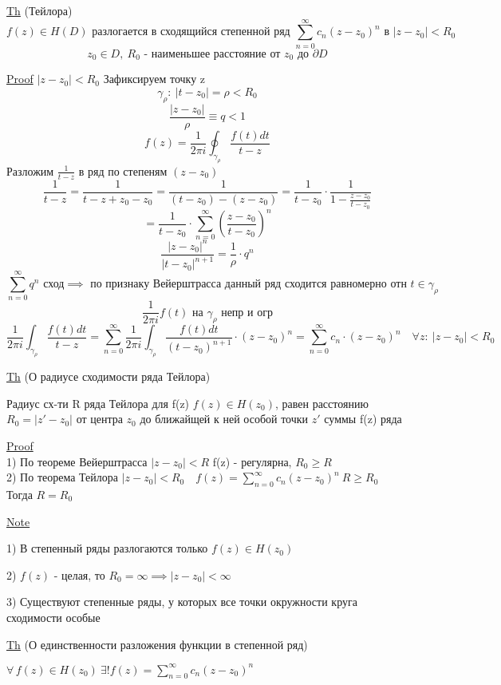 \documentclass[a4paper]{article}
\begin{document}
\begin{tcolorbox}
    \underline{Th} (Тейлора)
    \[
        f(z) \in H(D) \text{ разлогается в сходящийся степенной ряд }
        \sum_{n=0}^{\infty} c_n ( z - z_0)^{n} \text{ в } |z - z_0| < R_0
    \]
    \[
        z_0 \in D, \ R_0 \text{ - наименьшее расстояние от } z_0 \text{ до } \partial D
    \]

    \underline{Proof} $ |z - z_0| < R_0 $ 
    Зафиксируем точку z
    \[
        \gamma_\rho: \ |t - z_0| = \rho < R_0
    \]
    \[
        \frac{|z - z_0|}{\rho} \equiv q  < 1
    \]
    \[
        f(z) = \frac{1}{2 \pi i} \oint_{\gamma_\rho} \frac{f(t) dt}{t - z} 
    \]
    Разложим $ \frac{1}{t- z}  $ в ряд по степеням $ (z - z_0) $ 
    \[
        \frac{1}{t-z} = \frac{1}{t - z + z_0 - z_0} = \frac{1}{(t - z_0) - (z - z_0)} 
        = \frac{1}{t - z_0} \cdot \frac{1}{1 - \frac{z - z_0}{t - z_0}} 
    \]
    \[
        = \frac{1}{t - z_0} \cdot \sum_{n=0}^{\infty} \left( \frac{z - z_0}{t-z_0} \right)^{n}
    \]
    \[
         \frac{|z - z_0|^{n}}{|t-z_0|^{n+1}} = \frac{1}{\rho} \cdot q^{n}
    \]
    \[
        \sum_{n=0}^{\infty} q^{n} \text{ сход} \implies \text{ по признаку Вейерштрасса 
        данный ряд сходится равномерно отн } t \in \gamma_\rho
    \]
    \[
        \frac{1}{2 \pi i} f(t) \text{ на } \gamma_\rho \text{ непр и огр}
    \]
    \[
        \frac{1}{2 \pi i} \int_{\gamma_\rho} \frac{f(t) dt }{t - z} =
        \sum_{n=0}^{\infty} \frac{1}{2 \pi i} \int_{\gamma_\rho} 
        \frac{f(t)dt}{(t-z_0)^{n+1}} \cdot (z - z_0)^{n} = 
        \sum_{n=0}^{\infty} c_n \cdot (z - z_0)^{n} \quad \forall z: \ |z - z_0| < R_0
    \]
\end{tcolorbox}

\begin{tcolorbox}
    \underline{Th} (О радиусе сходимости ряда Тейлора)

    Радиус сх-ти R ряда Тейлора для f(z) $ f(z) \in H(z_0) $, равен расстоянию
    $ R_0 = |z' - z_0| $ от центра $ z_0 $ до ближайщей к ней особой точки
    $ z' $ суммы f(z) ряда

    \underline{Proof}\\
    1) По теореме Вейерштрасса $ |z - z_0| < R $ f(z) - регулярна, $ R_0 \geq R $\\
    2) По теорема Тейлора $ |z - z_0| < R_0 \quad f(z) = \sum_{n=0}^{\infty} 
    c_n(z- z_0)^{n}\  R \geq R_0$ \\
    Тогда $ R = R_0 $ 
\end{tcolorbox}

\begin{tcolorbox}
    \underline{Note}

    1) В степенный ряды разлогаются только $ f(z) \in H(z_0) $ 

    2) $ f(z) $ - целая, то $ R_0 = \infty \implies |z-z_0| < \infty $ 

    3) Существуют степенные ряды, у которых все точки окружности круга сходимости
    особые
\end{tcolorbox}

\begin{tcolorbox}
\underline{Th} (О единственности разложения функции в степенной ряд)

$ \forall \, f(z) \in H(z_0) \ \exists! f(z) = \sum_{n=0}^{\infty} c_n(z- z_0)^{n}  $ 
\end{tcolorbox}
\end{document}
